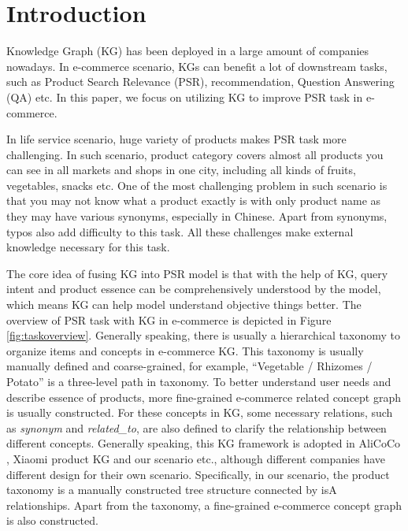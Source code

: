 \section{Introduction}

Knowledge Graph (KG) has been deployed in a large amount of companies nowadays. In e-commerce scenario, KGs can benefit a lot of downstream tasks, such as Product Search Relevance (PSR), recommendation, Question Answering (QA) etc. In this paper, we focus on utilizing KG to improve PSR task in e-commerce. 

In life service scenario, huge variety of products makes PSR task more challenging. In such scenario, product category covers almost all products you can see in all markets and shops in one city, including all kinds of fruits, vegetables, snacks etc. One of the most challenging problem in such scenario is that you may not know what a product exactly is with only product name as they may have various synonyms, especially in Chinese. Apart from synonyms, typos also add difficulty to this task. All these challenges make external knowledge necessary for this task. 

The core idea of fusing KG into PSR model is that with the help of KG, query intent and product essence can be comprehensively understood by the model, which means KG can help model understand objective things better. The overview of PSR task with KG in e-commerce is depicted in Figure \ref{fig:taskoverview}. Generally speaking, there is usually a hierarchical taxonomy to organize items and concepts in e-commerce KG. This taxonomy is usually manually defined and coarse-grained, for example, ``Vegetable / Rhizomes / Potato'' is a three-level path in taxonomy. To better understand user needs and describe essence of products, more fine-grained e-commerce related concept graph is usually constructed. For these concepts in KG, some necessary relations, such as \textit{synonym} and \textit{related\_to}, are also defined to clarify the relationship between different concepts. Generally speaking, this KG framework is adopted in AliCoCo \cite{luo2020alicoco, luo2021alicoco2}, Xiaomi product KG \cite{xiaomi} and our scenario etc., although different companies have different design for their own scenario. Specifically, in our scenario, the product taxonomy is a manually constructed tree structure connected by isA relationships. 
Apart from the taxonomy, a fine-grained e-commerce concept graph is also constructed. 

